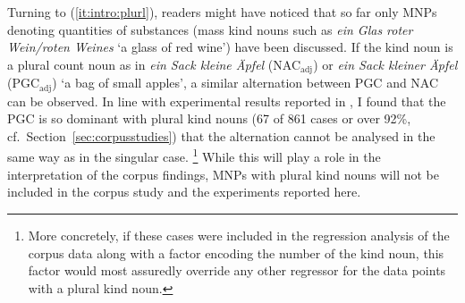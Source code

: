 \documentclass[USenglish]{article}
\newcommand{\Sub}[1]{\ensuremath{\mathrm{_{#1}}}}
\newcommand{\NACa}{NAC\Sub{adj}}
\newcommand{\PGCa}{PGC\Sub{adj}}
\begin{document}
% 

Turning to (\ref{it:intro:plurl}), readers might have noticed that so far only MNPs denoting quantities of substances (mass kind nouns such as \textit{ein Glas roter Wein\slash roten Weines} `a glass of red wine') have been discussed.
If the kind noun is a plural count noun as in \textit{ein Sack kleine Äpfel} (\NACa) or \textit{ein Sack kleiner Äpfel} (\PGCa) `a bag of small apples', a similar alternation between PGC and NAC can be observed.
In line with experimental results reported in \citet[15--16]{Zimmer2015}, I found that the PGC is so dominant with plural kind nouns (67 of 861 cases or over 92\%, cf.\ Section~\ref{sec:corpusstudies}) that the alternation cannot be analysed in the same way as in the singular case.%
\footnote{More concretely, if these cases were included in the regression analysis of the corpus data along with a factor encoding the number of the kind noun, this factor would most assuredly override any other regressor for the data points with a plural kind noun.}
While this will play a role in the interpretation of the corpus findings, MNPs with plural kind nouns will not be included in the corpus study and the experiments reported here.
\end{document}
